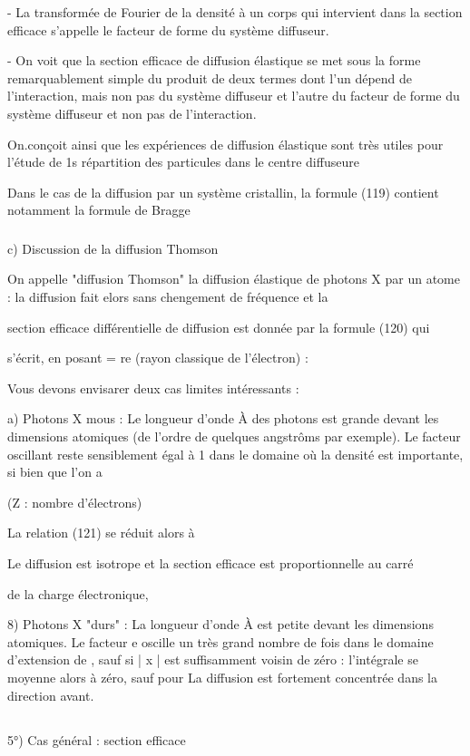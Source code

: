 - La transformée de Fourier de la densité à un corps qui intervient dans la
section efficace s'appelle le facteur de forme du système diffuseur.

- On voit que la section efficace de diffusion élastique se met sous la forme
remarquablement simple du produit de deux termes dont l'un dépend de l'interaction,
mais non pas du système diffuseur et l'autre du facteur de forme
du système diffuseur et non pas de l'interaction.

On.conçoit ainsi que les expériences de diffusion élastique sont
très utiles pour l'étude de 1s répartition des particules dans le centre diffuseure

Dans le cas de la diffusion par un système cristallin, la formule
(119) contient notamment la formule de Bragge
\subsubsection{}%
c) Discussion de la diffusion Thomson

On appelle "diffusion Thomson" la diffusion élastique de photons X
par un atome : la diffusion  fait elors sans chengement de fréquence et la

section efficace différentielle de diffusion est donnée par la formule (120) qui

s'écrit, en posant = re (rayon classique de l'électron) :

% 
Vous devons envisarer deux cas limites intéressants :

a) Photons X mous : Le longueur d'onde À des photons est
grande devant les dimensions atomiques (de l'ordre de quelques angstrôms
par exemple). Le facteur oscillant  reste sensiblement égal à 1 dans
le domaine où la densité est importante, si bien que l'on a

 (Z : nombre d'électrons)

La relation (121) se réduit alors à

Le diffusion est isotrope et la section efficace est proportionnelle au carré

de la charge électronique,

8) Photons X "durs" : La longueur d'onde À est petite devant les
dimensions atomiques. Le facteur e oscille un très grand nombre de fois
dans le domaine d'extension de , sauf si | x | est suffisamment voisin
de zéro : l'intégrale  se moyenne alors à zéro, sauf pour
La diffusion est fortement concentrée dans la direction avant.

\subsection{}%
5°) Cas général : section efficace

